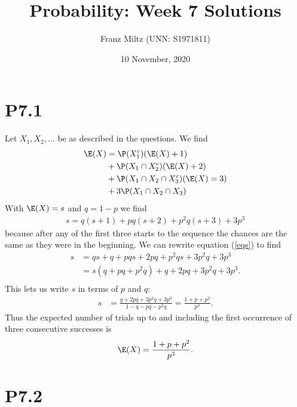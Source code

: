 \documentclass{article}
\begin{document}
\title{Probability: Week 7 Solutions}
\author{Franz Miltz (UNN: S1971811)}
\date{10 November, 2020}
\maketitle


\section*{P7.1}


Let $X_1,X_2,...$ be as described in the questions. We find 
\begin{align*}
  \E(X) &= \P(X_1^c)(\E(X)+1)\\
        &+\P(X_1\cap X_2^c)(\E(X)+2)\\
        &+\P(X_1\cap X_2\cap X_3^c)(\E(X)=3)\\
        &+3\P(X_1\cap X_2\cap X_3)
\end{align*}
With $\E(X)=s$ and $q=1-p$ we find
\begin{align}
  \label{eqs}
  s = q(s+1) + pq(s+2) + p^2q(s+3) +3p^3
\end{align}
because after any of the first three starts to the sequence the chances 
are the same as they were in the beginning.
We can rewrite equation (\ref{eqs}) to find
\begin{align*}
  s &= qs + q + pqs + 2pq + p^2qs + 3p^2q + 3p^3\\
    &= s(q+pq+p^2q)+q + 2pq + 3p^2q + 3p^3.\\
\end{align*}
This lets us write $s$ in terms of $p$ and $q$:
\begin{align*}
  s &= \frac{q+2pq+3p^2q+3p^3}{1-q-pq-p^2q} =\frac{1+p+p^2}{p^3}.
\end{align*}
Thus the expected number of trials up to and including the first occurrence of
three consecutive successes is
\begin{align*}
  \E(X) = \frac{1+p+p^2}{p^3}.
\end{align*}


\section*{P7.2}
\end{document}
